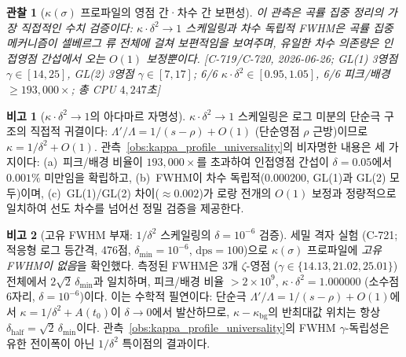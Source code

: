 \documentclass[11pt, a4paper]{article}
\theoremstyle{definition}
\newtheorem{remark}{비고}[section]
\theoremstyle{plain}
\newtheorem{observation}[theorem]{관찰}
\begin{document}
\begin{observation}[$\kappa(\sigma)$ 프로파일의 영점 간·차수 간 보편성]
\smallskip\noindent
이 관측은 곡률 집중 정리의 가장 직접적인 수치 검증이다:
$\kappa\cdot\delta^2 \to 1$ 스케일링과 차수 독립적 FWHM은
곡률 집중 메커니즘이 셀베르그 류 전체에 걸쳐 보편적임을 보여주며,
유일한 차수 의존량은 인접영점 간섭에서 오는 $O(1)$ 보정뿐이다.
[C-719/C-720, 2026-06-26;
GL(1) 3영점 $\gamma{\in}[14,25]$,
GL(2) 3영점 $\gamma{\in}[7,17]$;
6/6 $\kappa{\cdot}\delta^2 \in [0.95,1.05]$,
6/6 피크/배경 $\geq 193{,}000\times$;
총 CPU $4{,}247$초]
\end{observation}

\begin{remark}[$\kappa\cdot\delta^2 \to 1$의 아다마르 자명성]
\label{rem:hadamard_triviality}
$\kappa\cdot\delta^2 \to 1$ 스케일링은 로그 미분의 단순극 구조의
직접적 귀결이다:
$\Lambda'/\Lambda = 1/(s-\rho) + O(1)$ (단순영점 $\rho$ 근방)이므로
$\kappa = 1/\delta^2 + O(1)$.
관측~\ref{obs:kappa_profile_universality}의 비자명한 내용은 세 가지이다:
(a)~피크/배경 비율이 $193{,}000\times$를 초과하여
인접영점 간섭이 $\delta=0.05$에서 $0.001\%$ 미만임을 확립하고,
(b)~FWHM이 차수 독립적($0.000200$, GL(1)과 GL(2) 모두)이며,
(c)~GL(1)/GL(2) 차이($\approx 0.002$)가
로랑 전개의 $O(1)$ 보정과 정량적으로 일치하여
선도 차수를 넘어선 정밀 검증을 제공한다.
\end{remark}

\begin{remark}[고유 FWHM 부재: $1/\delta^2$ 스케일링의 $\delta=10^{-6}$ 검증]
\label{rem:fwhm_resolution}
세밀 격자 실험 (C-721; 적응형 로그 등간격, 476점,
$\delta_{\min}=10^{-6}$, $\mathrm{dps}=100$)으로
$\kappa(\sigma)$ 프로파일에 \emph{고유 FWHM이 없음}을 확인했다.
측정된 FWHM은 3개 $\zeta$-영점 ($\gamma \in \{14.13, 21.02, 25.01\}$)
전체에서 $2\sqrt{2}\,\delta_{\min}$과 일치하며,
피크/배경 비율 $>2\times 10^9$,
$\kappa\cdot\delta^2 = 1.000000$ (소수점 6자리, $\delta = 10^{-6}$)이다.
이는 수학적 필연이다: 단순극 $\Lambda'/\Lambda = 1/(s-\rho) + O(1)$에서
$\kappa = 1/\delta^2 + A(t_0)$이 $\delta \to 0$에서 발산하므로,
$\kappa - \kappa_{\mathrm{bg}}$의 반최대값 위치는 항상
$\delta_{\mathrm{half}} = \sqrt{2}\,\delta_{\min}$이다.
관측~\ref{obs:kappa_profile_universality}의 FWHM $\gamma$-독립성은
유한 전이폭이 아닌 $1/\delta^2$ 특이점의 결과이다.
\end{remark}
\end{document}
